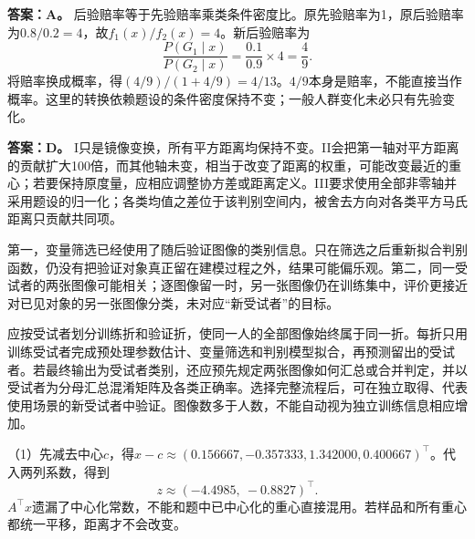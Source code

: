 \textbf{答案：A。} 后验赔率等于先验赔率乘类条件密度比。原先验赔率为1，原后验赔率为$0.8/0.2=4$，故$f_1(x)/f_2(x)=4$。新后验赔率为
\[
\frac{P(G_1\mid x)}{P(G_2\mid x)}=\frac{0.1}{0.9}\times4=\frac49.
\]
将赔率换成概率，得$(4/9)/(1+4/9)=4/13$。$4/9$本身是赔率，不能直接当作概率。这里的转换依赖题设的条件密度保持不变；一般人群变化未必只有先验变化。
\par\nobreak\smallskip{}

\textbf{答案：D。} I只是镜像变换，所有平方距离均保持不变。II会把第一轴对平方距离的贡献扩大100倍，而其他轴未变，相当于改变了距离的权重，可能改变最近的重心；若要保持原度量，应相应调整协方差或距离定义。III要求使用全部非零轴并采用题设的归一化；各类均值之差位于该判别空间内，被舍去方向对各类平方马氏距离只贡献共同项。
\par\nobreak\smallskip{}

第一，变量筛选已经使用了随后验证图像的类别信息。只在筛选之后重新拟合判别函数，仍没有把验证对象真正留在建模过程之外，结果可能偏乐观。第二，同一受试者的两张图像可能相关；逐图像留一时，另一张图像仍在训练集中，评价更接近对已见对象的另一张图像分类，未对应“新受试者”的目标。

应按受试者划分训练折和验证折，使同一人的全部图像始终属于同一折。每折只用训练受试者完成预处理参数估计、变量筛选和判别模型拟合，再预测留出的受试者。若最终输出为受试者类别，还应预先规定两张图像如何汇总或合并判定，并以受试者为分母汇总混淆矩阵及各类正确率。选择完整流程后，可在独立取得、代表使用场景的新受试者中验证。图像数多于人数，不能自动视为独立训练信息相应增加。
\par\nobreak\smallskip{}

（1）先减去中心$c$，得$x-c\approx(0.156667,-0.357333,1.342000,0.400667)^\top$。代入两列系数，得到
\[
z\approx(-4.4985,\ -0.8827)^\top.
\]
$A^\top x$遗漏了中心化常数，不能和题中已中心化的重心直接混用。若样品和所有重心都统一平移，距离才不会改变。

